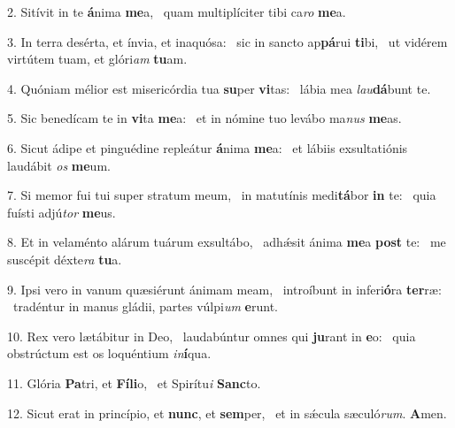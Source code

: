 2. Sitívit in te \textbf{á}nima \textbf{me}a, \ast\  quam multiplíciter tibi ca\textit{ro} \textbf{me}a.\

3. In terra desérta, et ínvia, et inaquósa: \dag\  sic in sancto ap\textbf{pá}rui \textbf{ti}bi, \ast\  ut vidérem virtútem tuam, et glóri\textit{am} \textbf{tu}am.\

4. Quóniam mélior est misericórdia tua \textbf{su}per \textbf{vi}tas: \ast\  lábia mea \textit{lau}\textbf{dá}bunt te.\

5. Sic benedícam te in \textbf{vi}ta \textbf{me}a: \ast\  et in nómine tuo levábo ma\textit{nus} \textbf{me}as.\

6. Sicut ádipe et pinguédine repleátur \textbf{á}nima \textbf{me}a: \ast\  et lábiis exsultatiónis laudábit \textit{os} \textbf{me}um.\

7. Si memor fui tui super stratum meum, \dag\  in matutínis medi\textbf{tá}bor \textbf{in} te: \ast\  quia fuísti adjú\textit{tor} \textbf{me}us.\

8. Et in velaménto alárum tuárum exsultábo, \dag\  adhǽsit ánima \textbf{me}a \textbf{post} te: \ast\  me suscépit déxte\textit{ra} \textbf{tu}a.\

9. Ipsi vero in vanum quæsiérunt ánimam meam, \dag\  introíbunt in inferi\textbf{ó}ra \textbf{ter}ræ: \ast\  tradéntur in manus gládii, partes vúlpi\textit{um} \textbf{e}runt.\

10. Rex vero lætábitur in Deo, \dag\  laudabúntur omnes qui \textbf{ju}rant in \textbf{e}o: \ast\  quia obstrúctum est os loquéntium \textit{in}\textbf{í}qua.\

11. Glória \textbf{Pa}tri, et \textbf{Fí}\textbf{li}o, \ast\  et Spirítu\textit{i} \textbf{Sanc}to.\

12. Sicut erat in princípio, et \textbf{nunc}, et \textbf{sem}per, \ast\  et in sǽcula sæculó\textit{rum}. \textbf{A}men.\

